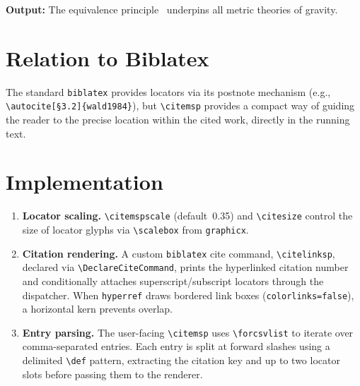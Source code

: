 \documentclass[11pt, a4paper]{article}
\begin{document}
\noindent\textbf{Output:} The equivalence principle~ underpins all metric theories of gravity.


\section{Relation to Biblatex}

The standard \texttt{biblatex} provides locators via its postnote mechanism (e.g., \verb|\autocite[§3.2]{wald1984}|), but \texttt{\textbackslash citemsp} provides a compact way of guiding the reader to the precise location within the cited work, directly in the running text.


\section{Implementation}

\begin{enumerate}
  \item \textbf{Locator scaling.} \texttt{\textbackslash citemspscale} (default~0.35) and \texttt{\textbackslash citesize} control the size of locator glyphs via \texttt{\textbackslash scalebox} from \texttt{graphicx}.

  \item \textbf{Citation rendering.} A custom \texttt{biblatex} cite command, \texttt{\textbackslash citelinksp}, declared via \texttt{\textbackslash DeclareCiteCommand}, prints the hyperlinked citation number and conditionally attaches superscript/subscript locators through the dispatcher. When \texttt{hyperref} draws bordered link boxes (\texttt{colorlinks=false}), a horizontal kern prevents overlap.

  \item \textbf{Entry parsing.} The user-facing \texttt{\textbackslash citemsp} uses \texttt{\textbackslash forcsvlist} to iterate over comma-separated entries. Each entry is split at forward slashes using a delimited \texttt{\textbackslash def} pattern, extracting the citation key and up to two locator slots before passing them to the renderer.
\end{enumerate}



\printbibliography
\end{document}
